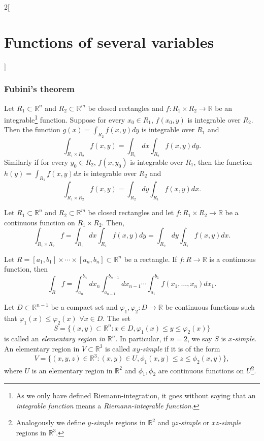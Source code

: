 \documentclass[../../../main.tex]{subfiles}
\begin{document}
\begin{multicols}{2}[\section{Functions of several variables}]
\subsubsection*{Fubini's theorem}
\begin{theorem}
Let $R_1\subset\mathbb{R}^n$ and $R_2\subset\mathbb{R}^m$ be closed rectangles and $f:R_1\times R_2\rightarrow\mathbb{R}$ be an integrable\footnote{As we only have defined Riemann-integration, it goes without saying that an \textit{integrable function} means a \textit{Riemann-integrable function}.} function. Suppose for every $x_0\in R_1$, $f(x_0,y)$ is integrable over $R_2$. Then the function $\displaystyle g(x)=\int_{R_2}f(x,y)dy$ is integrable over $R_1$ and $$\int_{R_1\times R_2}f(x,y)=\int_{R_1}dx\int_{R_2}f(x,y)dy.$$ Similarly if for every $y_0\in R_2$, $f(x,y_0)$ is integrable over $R_1$, then the function $\displaystyle h(y)=\int_{R_1}f(x,y)dx$ is integrable over $R_2$ and $$\int_{R_1\times R_2}f(x,y)=\int_{R_2}dy\int_{R_1}f(x,y)dx.$$
\begin{corollary}
Let $R_1\subset\mathbb{R}^n$ and $R_2\subset\mathbb{R}^m$ be closed rectangles and let $f:R_1\times R_2\rightarrow\mathbb{R}$ be a continuous function on $R_1\times R_2$. Then, $$\int_{R_1\times R_2}f=\int_{R_1}dx\int_{R_2}f(x,y)dy=\int_{R_2}dy\int_{R_1}f(x,y)dx.$$
\end{corollary}
\begin{corollary}
Let $R=[a_1,b_1]\times\cdots\times[a_n,b_n]\subset\mathbb{R}^n$ be a rectangle. If $f:R\rightarrow\mathbb{R}$ is a continuous function, then $$\int_Rf=\int_{a_n}^{b_n}dx_n\int_{a_{n-1}}^{b_{n-1}}dx_{n-1}\cdots\int_{a_1}^{b_1}f(x_1,\ldots,x_n)dx_1.$$
\end{corollary}
\begin{definition}
Let $D\subset\mathbb{R}^{n-1}$ be a compact set and $\varphi_1,\varphi_2:D\rightarrow\mathbb{R}$ be continuous functions such that $\varphi_1(x)\leq\varphi_2(x)$ $\forall x\in D$. The set $$S=\{(x,y)\subset\mathbb{R}^n:x\in D, \varphi_1(x)\leq y\leq\varphi_2(x)\}$$ is called an \textit{elementary region in $\mathbb{R}^n$}. In particular, if $n=2$, we say $S$ is \textit{$x$-simple}. An elementary region in $V\subset\mathbb{R}^3$ is called \textit{$xy$-simple} if it is of the form $$V=\{(x,y,z)\in\mathbb{R}^3:(x,y)\in U, \phi_1(x,y)\leq z\leq\phi_2(x,y)\},$$ where $U$ is an elementary region in $\mathbb{R}^2$ and $\phi_1,\phi_2$ are continuous functions on $U$\footnote{Analogously we define \textit{$y$-simple} regions in $\mathbb{R}^2$ and \textit{$yz$-simple} or \textit{$xz$-simple} regions in $\mathbb{R}^3$.}.

\end{definition}
\end{theorem}
\end{multicols}
\end{document}
